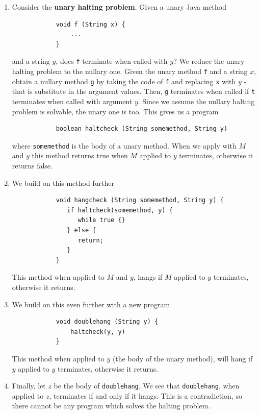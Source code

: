 \documentclass[11pt]{article}
\begin{document}
	\begin{enumerate}
		\item Consider the \textbf{unary halting problem}. Given a unary Java method
		\begin{verbatim}
			void f (String x) {
			    ...
			}
		\end{verbatim}			
		and a string $y$, does \texttt{f} terminate when called with $y$? We reduce the unary halting problem to the nullary one. Given the unary method \texttt{f} and a string $x$, obtain a nullary method \texttt{g} by taking the code of \texttt{f} and replacing \texttt{x} with $y$ - that is substitute in the argument values. Then, \texttt{g} terminates when called if \texttt{t} terminates when called with argument $y$. Since we assume the nullary halting problem is solvable, the unary one is too. This gives us a program
		\begin{verbatim}
			boolean haltcheck (String somemethod, String y)
		\end{verbatim}
		
		where \texttt{somemethod} is the body of a unary method. When we apply with $M$ and $y$ this method returns true when $M$ applied to $y$ terminates, otherwise it returns false.
	
	\item We build on this method further
		\begin{verbatim}
			void hangcheck (String somemethod, String y) {
			   if haltcheck(somemethod, y) {
			      while true {}
			   } else {
			      return;
			   }
			}
		\end{verbatim}	
		
		This method when applied to $M$ and $y$, hangs if $M$ applied to $y$ terminates, otherwise it returns.
				
	\item We build on this even further with a new program
		\begin{verbatim}
			void doublehang (String y) {
			    haltcheck(y, y)
			}
		\end{verbatim}
		
		This method when applied to $y$ (the body of the unary method), will hang if $y$ applied to $y$ terminates, otherwise it returns.
	
	\item Finally, let $z$ be the body of \texttt{doublehang}. We see that \texttt{doublehang}, when applied to $z$, terminates if and only if it hangs. This is a contradiction, so there cannot be any program which solves the halting problem.	
	
	\end{enumerate}
		
\end{document}
